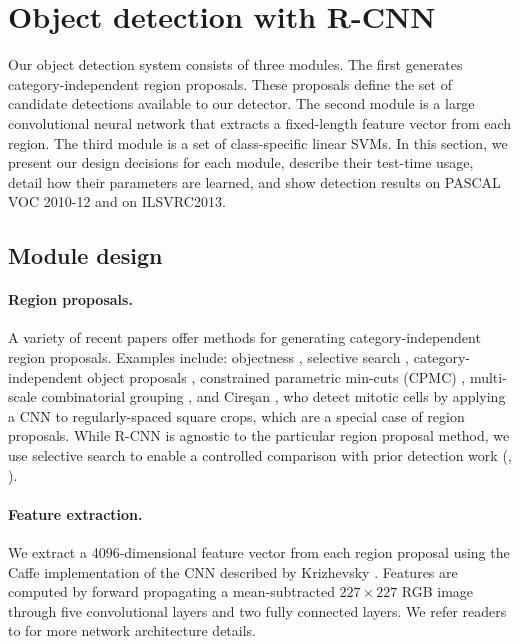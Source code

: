 \section{Object detection with R-CNN}

Our object detection system consists of three modules.
The first generates category-independent region proposals. 
These proposals define the set of candidate detections available to our detector.
The second module is a large convolutional neural network that extracts a fixed-length feature vector from each region. 
The third module is a set of class-specific linear SVMs.
In this section, we present our design decisions for each module, describe their test-time usage, detail how their parameters are learned, and show detection results on PASCAL VOC 2010-12 and on ILSVRC2013.

\subsection{Module design}

\paragraph{Region proposals.}
A variety of recent papers offer methods for generating category-independent 
region proposals. Examples include: objectness \cite{objectness-pami},
selective search \cite{UijlingsIJCV2013}, category-independent
object proposals \cite{endres2010category}, constrained parametric min-cuts (CPMC)
\cite{carreira2012cpmc}, multi-scale combinatorial grouping \cite{mcg2014}, and Cire{\c{s}}an \etal \cite{cirecsan2013mitosis}, who detect mitotic cells by applying a CNN to regularly-spaced square crops, which are a special case of region proposals.
While R-CNN is agnostic to the particular region proposal method, we use selective search to enable a controlled comparison with prior detection work (\eg, \cite{UijlingsIJCV2013,regionlets}).

\paragraph{Feature extraction.}
We extract a 4096-dimensional feature vector from each region proposal using the Caffe \cite{Jia13caffe} implementation of the CNN described by Krizhevsky \etal
\cite{krizhevsky2012imagenet}.
Features are computed by forward propagating a mean-subtracted $227 \times 227$ 
RGB image through five convolutional layers and two fully connected layers.
We refer readers to \cite{Jia13caffe,krizhevsky2012imagenet} for more network architecture details.

